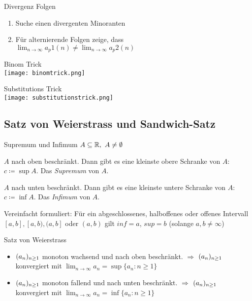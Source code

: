 \begin{KR}{Divergenz Folgen}
    \begin{enumerate}
        \item  Suche einen divergenten Minoranten
        \item Für alternierende Folgen zeige, dass \\$\lim_{n \to \infty} a_p1(n) \neq \lim_{n \to \infty} a_p2(n)$
    \end{enumerate}
\end{KR}

\begin{KR}{Binom Trick}\\
    \texttt{[image: binomtrick.png]}
\end{KR}

\begin{KR}{Substitutions Trick}\\
    \texttt{[image: substitutionstrick.png]}
\end{KR}

\subsection{Satz von Weierstrass und Sandwich-Satz}

\begin{definition}{Supremum und Infimum}
    $A \subseteq \mathbb{R}, ~A\neq \emptyset$
    \begin{enumerateroman}
        \item $A$ nach oben beschränkt. Dann gibt es eine kleinste obere Schranke von $A$: $c \coloneqq \sup A$. Das \emph{Supremum} von $A$.
        \item $A$ nach unten beschränkt. Dann gibt es eine kleinste untere Schranke von $A$: $c \coloneqq \inf A$. Das \emph{Infimum} von $A$.
    \end{enumerateroman}
    \tcblower
    Vereinfacht formuliert: Für ein abgeschlossenes, halboffenes oder offenes Intervall $[a,b], [a,b), (a,b]$ oder $(a,b)$ gilt $inf = a$, $sup = b$ (solange $a, b \neq \infty$)
\end{definition}

\begin{concept}{Satz von Weierstrass}
    \begin{itemize}
        \item $(a_n)_{n \geq 1}$ monoton wachsend und nach oben beschränkt. $\Rightarrow$ $(a_n)_{n \geq 1}$ konvergiert mit $\lim_{n \to \infty} a_n = \sup \{a_n : n \geq 1\}$
        \item $(a_n)_{n \geq 1}$ monoton fallend und nach unten beschränkt. $\Rightarrow$ $(a_n)_{n \geq 1}$ konvergiert mit $\lim_{n \to \infty} a_n = \inf \{a_n : n \geq 1\}$
    \end{itemize}
\end{concept}

